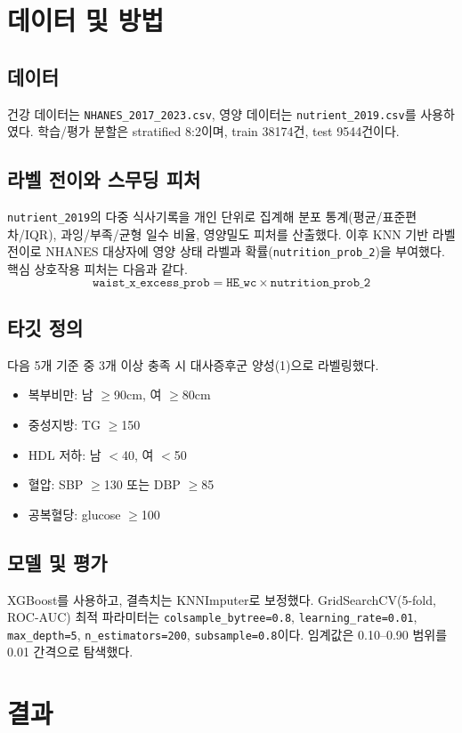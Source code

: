 \documentclass[10pt,twocolumn]{article}
\begin{document}
\section{데이터 및 방법}
\subsection{데이터}
건강 데이터는 \texttt{NHANES\_2017\_2023.csv}, 영양 데이터는 \texttt{nutrient\_2019.csv}를 사용하였다.
학습/평가 분할은 stratified 8:2이며, train 38174건, test 9544건이다.

\subsection{라벨 전이와 스무딩 피처}
\texttt{nutrient\_2019}의 다중 식사기록을 개인 단위로 집계해 분포 통계(평균/표준편차/IQR), 과잉/부족/균형 일수 비율, 영양밀도 피처를 산출했다.
이후 KNN 기반 라벨 전이로 NHANES 대상자에 영양 상태 라벨과 확률(\texttt{nutrition\_prob\_2})을 부여했다.
핵심 상호작용 피처는 다음과 같다.
\[
\texttt{waist\_x\_excess\_prob}=\texttt{HE\_wc}\times \texttt{nutrition\_prob\_2}
\]

\subsection{타깃 정의}
다음 5개 기준 중 3개 이상 충족 시 대사증후군 양성(1)으로 라벨링했다.
\begin{itemize}[leftmargin=1.2em]
\item 복부비만: 남 $\ge$90cm, 여 $\ge$80cm
\item 중성지방: TG $\ge$150
\item HDL 저하: 남 $<$40, 여 $<$50
\item 혈압: SBP $\ge$130 또는 DBP $\ge$85
\item 공복혈당: glucose $\ge$100
\end{itemize}

\subsection{모델 및 평가}
XGBoost를 사용하고, 결측치는 KNNImputer로 보정했다.
GridSearchCV(5-fold, ROC-AUC) 최적 파라미터는
\texttt{colsample\_bytree=0.8}, \texttt{learning\_rate=0.01},
\texttt{max\_depth=5}, \texttt{n\_estimators=200}, \texttt{subsample=0.8}이다.
임계값은 0.10--0.90 범위를 0.01 간격으로 탐색했다.

\section{결과}
\end{document}
